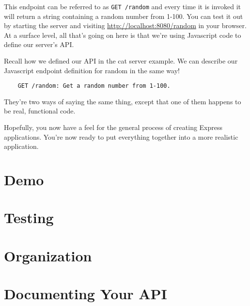 This endpoint can be referred to as \texttt{GET /random} and every time it is invoked it will return a string containing a random number from 1-100. You can test it out by starting the server and visiting \url{http://localhost:8080/random} in your browser. At a surface level, all that's going on here is that we're using Javascript code to define our server's API. 

\begin{kaobox}[title=Describing the API with English]
    Recall how we defined our API in the cat server example. We can describe our Javascript endpoint definition for random in the same way! 

    \begin{verbatim}
    GET /random: Get a random number from 1-100.
    \end{verbatim}
    
    They're two ways of saying the same thing, except that one of them happens to be real, functional code.
\end{kaobox}

Hopefully, you now have a feel for the general process of creating Express applications. You're now ready to put everything together into a more realistic application.

\section{Demo}

\section{Testing}

\section{Organization}

\section{Documenting Your API}

